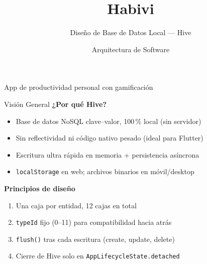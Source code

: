 \documentclass[11pt,landscape]{beamer}
\title{\textbf{\Huge Habivi}}
\subtitle{\large Diseño de Base de Datos Local --- Hive}
\author{Arquitectura de Software}
\date{}
\begin{document}
\begin{frame}
  \titlepage
  \vfill
  \centering
  {\small \color{gray} App de productividad personal con gamificación}
\end{frame}

\begin{frame}{Visión General}
  \textbf{¿Por qué Hive?}
  \begin{itemize}
    \item Base de datos NoSQL clave--valor, \alert{100\,\% local} (sin servidor)
    \item Sin reflectividad ni código nativo pesado (ideal para Flutter)
    \item Escritura ultra rápida en memoria + persistencia asíncrona
    \item \texttt{localStorage} en web; archivos binarios en móvil/desktop
  \end{itemize}

  \vspace{0.4cm}
  \textbf{Principios de diseño}
  \begin{enumerate}
    \item Una \alert{caja} por entidad, 12 cajas en total
    \item \texttt{typeId} fijo (0–11) para compatibilidad hacia atrás
    \item \texttt{flush()} tras cada escritura (create, update, delete)
    \item Cierre de Hive solo en \texttt{AppLifecycleState.detached}
  \end{enumerate}
\end{frame}
\end{document}
